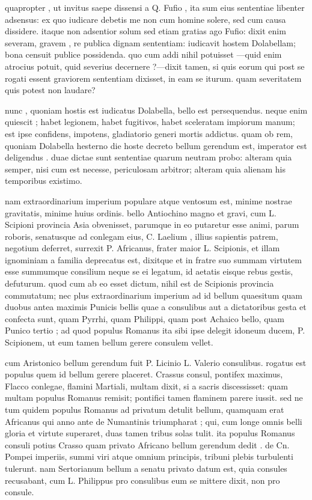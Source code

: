  quapropter , ut invitus saepe dissensi a Q. Fufio , ita sum eius sententiae libenter adsensus: ex quo iudicare debetis me non cum homine solere, sed cum causa dissidere. itaque non adsentior solum sed etiam gratias ago Fufio: dixit enim severam, gravem , re publica dignam sententiam: iudicavit hostem Dolabellam; bona censuit publice possidenda. quo cum addi nihil potuisset —quid enim atrocius potuit, quid severius decernere ?—dixit tamen, si quis eorum qui post se rogati essent graviorem sententiam dixisset, in eam se iturum. quam severitatem quis potest non laudare?

 nunc , quoniam hostis est iudicatus Dolabella, bello est persequendus. neque enim quiescit ; habet legionem, habet fugitivos, habet sceleratam impiorum manum; est ipse confidens, impotens, gladiatorio generi mortis addictus. quam ob rem, quoniam Dolabella hesterno die hoste decreto bellum gerendum est, imperator est deligendus . duae dictae sunt sententiae quarum neutram probo: alteram quia semper, nisi cum est necesse, periculosam arbitror; alteram quia alienam his temporibus existimo.

 nam extraordinarium imperium populare atque ventosum est, minime nostrae gravitatis, minime huius ordinis. bello Antiochino magno et gravi, cum L. Scipioni provincia Asia obvenisset, parumque in eo putaretur esse animi, parum roboris, senatusque ad conlegam eius, C. Laelium , illius sapientis patrem, negotium deferret, surrexit P. Africanus, frater maior L. Scipionis, et illam ignominiam a familia deprecatus est, dixitque et in fratre suo summam virtutem esse summumque consilium neque se ei legatum, id aetatis eisque rebus gestis, defuturum. quod cum ab eo esset dictum, nihil est de Scipionis provincia commutatum; nec plus extraordinarium imperium ad id bellum quaesitum quam duobus antea maximis Punicis bellis quae a consulibus aut a dictatoribus gesta et confecta sunt, quam Pyrrhi, quam Philippi, quam post Achaico bello, quam Punico tertio ; ad quod populus Romanus ita sibi ipse delegit idoneum ducem, P. Scipionem, ut eum tamen bellum gerere consulem vellet.

 cum Aristonico bellum gerendum fuit P. Licinio L. Valerio consulibus. rogatus est populus quem id bellum gerere placeret. Crassus consul, pontifex maximus, Flacco conlegae, flamini Martiali, multam dixit, si a sacris discessisset: quam multam populus Romanus remisit; pontifici tamen flaminem parere iussit. sed ne tum quidem populus Romanus ad privatum detulit bellum, quamquam erat Africanus qui anno ante de Numantinis triumpharat ; qui, cum longe omnis belli gloria et virtute superaret, duas tamen tribus solas tulit. ita populus Romanus consuli potius Crasso quam privato Africano bellum gerendum dedit . de Cn. Pompei imperiis, summi viri atque omnium principis, tribuni plebis turbulenti tulerunt. nam Sertorianum bellum a senatu privato datum est, quia consules recusabant, cum L. Philippus pro consulibus eum se mittere dixit, non pro consule.

